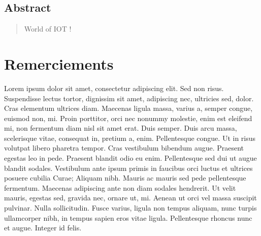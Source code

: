 \documentclass[a4paper,12pt]{book}
\theoremstyle{break}
\begin{document}
\begin{otherlanguage}{english}
  \chapter{Abstract}
  \begin{quotation}
	World of IOT !
  \end{quotation}
\end{otherlanguage}

\chapter{Remerciements}
Lorem ipsum dolor sit amet, consectetur adipiscing elit. Sed non risus. Suspendisse lectus tortor, dignissim sit amet, adipiscing nec, ultricies sed, dolor. Cras elementum ultrices diam. Maecenas ligula massa, varius a, semper congue, euismod non, mi. Proin porttitor, orci nec nonummy molestie, enim est eleifend mi, non fermentum diam nisl sit amet erat. Duis semper. Duis arcu massa, scelerisque vitae, consequat in, pretium a, enim. Pellentesque congue. Ut in risus volutpat libero pharetra tempor. Cras vestibulum bibendum augue. Praesent egestas leo in pede. Praesent blandit odio eu enim. Pellentesque sed dui ut augue blandit sodales. Vestibulum ante ipsum primis in faucibus orci luctus et ultrices posuere cubilia Curae; Aliquam nibh. Mauris ac mauris sed pede pellentesque fermentum. Maecenas adipiscing ante non diam sodales hendrerit. Ut velit mauris, egestas sed, gravida nec, ornare ut, mi. Aenean ut orci vel massa suscipit pulvinar. Nulla sollicitudin. Fusce varius, ligula non tempus aliquam, nunc turpis ullamcorper nibh, in tempus sapien eros vitae ligula. Pellentesque rhoncus nunc et augue. Integer id felis.

\tableofcontents

\listoffigures

\end{document}
